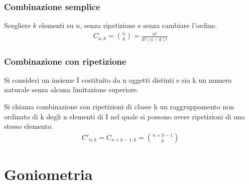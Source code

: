 \documentclass[a4paper]{article}
\begin{document}
	\subsubsection{Combinazione semplice}
	Scegliere $k$ elementi su $n$, senza ripetizione e senza cambiare l'ordine.
	\begin{align*}
		C_{n,k} = {{n}\choose{k}} = \frac{n!}{k!(n-k)!} 
	\end{align*}
	
	\subsubsection{Combinazione con ripetizione}
	Si consideri un insieme I costituito da n oggetti distinti e sia k un numero naturale senza alcuna limitazione superiore.
	
	Si chiama combinazione con ripetizioni di classe k un raggruppamento non ordinato di k degli n elementi di I nel quale si possono avere ripetizioni di uno stesso elemento.\\
	\begin{align*}
		C'_{n,k} = C_{n+k-1 , k} = {{n+k-1}\choose{k}}
	\end{align*}
	
	\newpage
	\section{Goniometria}
		
\end{document}
